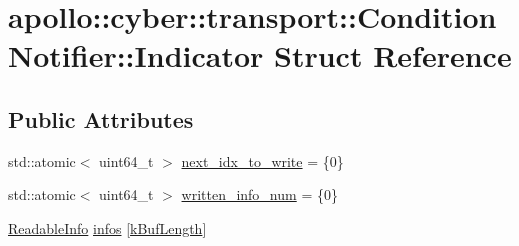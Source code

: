 \hypertarget{structapollo_1_1cyber_1_1transport_1_1ConditionNotifier_1_1Indicator}{\section{apollo\-:\-:cyber\-:\-:transport\-:\-:Condition\-Notifier\-:\-:Indicator Struct Reference}
\label{structapollo_1_1cyber_1_1transport_1_1ConditionNotifier_1_1Indicator}
}
\subsection*{Public Attributes}
\begin{DoxyCompactItemize}
\item 
std\-::atomic$<$ uint64\-\_\-t $>$ \hyperlink{structapollo_1_1cyber_1_1transport_1_1ConditionNotifier_1_1Indicator_a1982f4b9b860d3141523143518567049}{next\-\_\-idx\-\_\-to\-\_\-write} = \{0\}
\item 
std\-::atomic$<$ uint64\-\_\-t $>$ \hyperlink{structapollo_1_1cyber_1_1transport_1_1ConditionNotifier_1_1Indicator_a10e7c84d2e0c307c9c72f5160f83d8ec}{written\-\_\-info\-\_\-num} = \{0\}
\item 
\hyperlink{classapollo_1_1cyber_1_1transport_1_1ReadableInfo}{Readable\-Info} \hyperlink{structapollo_1_1cyber_1_1transport_1_1ConditionNotifier_1_1Indicator_aa5c93bf8b4d22a52019d524ef1991455}{infos} \mbox{[}\hyperlink{namespaceapollo_1_1cyber_1_1transport_a12bcc39dba9d39eab46f409750a9e1e8}{k\-Buf\-Length}\mbox{]}
\end{DoxyCompactItemize}



